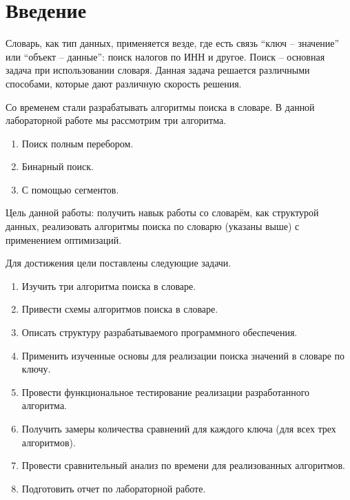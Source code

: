 \chapter*{Введение}

Словарь, как тип данных, применяется везде, где есть связь “ключ -- значение” или “объект -- данные”: поиск налогов по ИНН и другое. Поиск -- основная задача при использовании словаря. Данная задача решается различными способами, которые дают различную скорость решения.

Со временем стали разрабатывать алгоритмы поиска в словаре. В данной лабораторной работе мы рассмотрим три алгоритма.
\begin{enumerate}
	\item Поиск полным перебором.
	\item Бинарный поиск.
	\item С помощью сегментов.
\end{enumerate}

Цель данной работы: получить навык работы со словарём, как структурой данных, реализовать алгоритмы поиска по словарю (указаны выше) с применением оптимизаций.

Для достижения цели поставлены следующие задачи.
\begin{enumerate}
	\item Изучить три алгоритма поиска в словаре.
	\item Привести схемы алгоритмов поиска в словаре.
	\item Описать структуру разрабатываемого программного обеспечения.
	\item Применить изученные основы для реализации поиска значений в словаре по ключу.
	\item Провести функциональное тестирование реализации разработанного алгоритма.
	\item Получить замеры количества сравнений для каждого ключа (для всех трех алгоритмов).
	\item Провести сравнительный анализ по времени для реализованных алгоритмов.
	\item Подготовить отчет по лабораторной работе.
\end{enumerate}